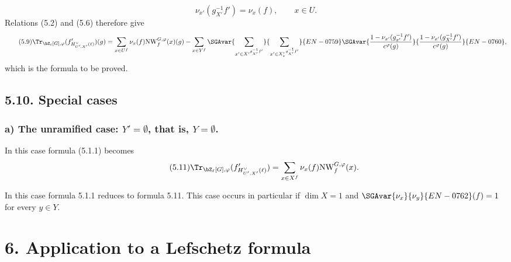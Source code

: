 \begin{equation}\tag{5.8}
\nu_{x'}(g_{X'}^{-1}f')=\nu_x(f),
\qquad x\in U.
\end{equation}
Relations (5.2) and (5.6) therefore give
\begin{equation}\tag{5.9}
\Tr_{\bZ_\ell[G],\varphi}(f'_{H^\vee_{U',X'}(\ell)})(g)
=\sum_{x\in U^f}\nu_x(f)\mathrm{NW}_f^{G,\varphi}(x)(g)
-\sum_{x\in Y^f}\SGAvar{\sum_{x'\in {X'}^{g_{X'}^{-1}f'}}}{\sum_{x'\in {X'_x}^{g_{X'}^{-1}f'}}}{EN-0759}
\SGAvar{\frac{1-\nu_{x'}(g_{x'}^{-1}f')}{c^\varphi(g)}}{\frac{1-\nu_{x'}(g_{X'}^{-1}f')}{c^\varphi(g)}}{EN-0760},
\end{equation}
which is the formula to be proved.

\subsection*{5.10. Special cases}
\subsubsection*{a) The unramified case: $Y'=\emptyset$, that is, $Y=\emptyset$.}
In this case formula (5.1.1) becomes
\begin{equation}\tag{5.11}
\Tr_{\bZ_\ell[G],\varphi}(f'_{H^\vee_{U',X'}(\ell)})
=
\sum_{x\in X^f}\nu_x(f)\mathrm{NW}_f^{G,\varphi}(x).
\end{equation}

In this case formula 5.1.1 reduces to formula 5.11. This case occurs in particular if $\dim X=1$ and $\SGAvar{\nu_x}{\nu_y}{EN-0762}(f)=1$ for every $y\in Y$.

\section*{6. Application to a Lefschetz formula}

